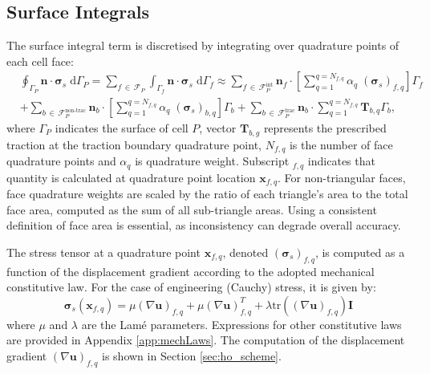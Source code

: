 \documentclass[sn-mathphys,Numbered]{sn-jnl}%
\newcommand{\bb}{\boldsymbol}
\begin{document}
\subsection{Surface Integrals}
\label{sec:vol_int}
%
The surface integral term is discretised by integrating over quadrature points of each cell face:
%
\begin{equation}\label{eq:divStressDiscret}
\begin{split}
&\oint_{\Gamma_P} \bb{n} \cdot \bb{\sigma}_s \; \text{d}\Gamma_P  
=
\sum_{f \, \in \,\mathcal{F}_P} \int_{\Gamma_f} \bb{n} \cdot \bb{\sigma}_s \; \text{d}\Gamma_f 
\approx 
\sum_{f \,\in\, \mathcal{F}_P^{\text{int}}} \bb{n}_{f} \cdot \left [ \sum_{q=1}^{q=N_{f,q}}\alpha_q \; (\bb{\sigma}_s)_{f,q} \right]\Gamma_f \\
& + \sum_{b\, \in \,\mathcal{F}_P^{\text{non-trac}}}  \bb{n}_{b} \cdot \left [ \sum_{q=1}^{q=N_{f,q}}\alpha_q \; (\bb{\sigma}_s)_{b,q} \right]\Gamma_b 
+ \sum_{b\, \in \, \mathcal{F}_P^{\text{trac}}}   \bb{n}_{b} \cdot  \sum_{q=1}^{q=N_{f,q}}\bb{T}_{b,q} \Gamma_b,
\end{split}
\end{equation}
%
where $\Gamma_P$ indicates the surface of cell $P$, 
vector $\bb{T}_{b,g}$ represents the prescribed traction at the traction boundary quadrature point,
$N_{f,q}$ is the number of face quadrature points and
$\alpha_q$ is quadrature weight. Subscript $_{f,q}$ indicates that quantity is calculated at quadrature point location $\bb{x}_{f,q}$.
For non-triangular faces, face quadrature weights are scaled by the ratio of each triangle’s area to the total face area,
computed as the sum of all sub-triangle areas. Using a consistent definition of face area is essential, 
as inconsistency can degrade overall accuracy.

The stress tensor at a quadrature point $\bb{x}_{f,q}$, denoted $(\bb{\sigma}_s)_{f,q}$, is computed as a function of the displacement gradient according to the adopted mechanical constitutive law.
For the case of engineering (Cauchy) stress, it is given by:
\begin{equation}
\bb{\sigma}_s(\bb{x}_{f,q}) =   \mu (\nabla \bb{u})_{f,q} + \mu (\nabla \bb{u})^T_{f,q} +\lambda \text{tr}((\nabla \bb{u})_{f,q} )\mathbf{I}
\end{equation}
where $\mu$ and $\lambda$ are the Lamé parameters.
Expressions for other constitutive laws are provided in Appendix \ref{app:mechLaws}.
The computation of the displacement gradient $(\nabla \bb{u})_{f,q}$ is shown in Section \ref{sec:ho_scheme}.
%
\end{document}
